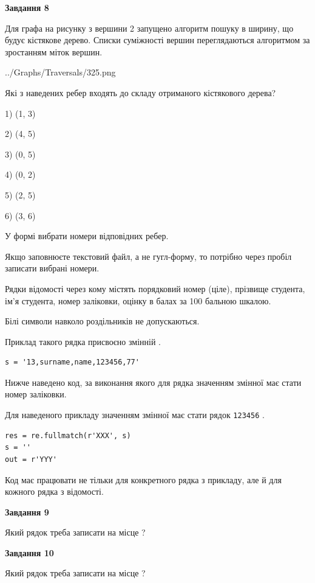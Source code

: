 \documentclass[12pt, ukrainian]{article}
\def\code#1{\Verb!#1!}
\begin{document}
{\begin {large}
{\begin {center}\textbf{Завдання 8}\end {center}}\par
Для графа на рисунку з вершини 2 запущено алгоритм пошуку в ширину, що будує кістякове дерево. Списки суміжності вершин переглядаються алгоритмом за зростанням міток вершин.\par
\begin{center}
	{../Graphs/Traversals/325.png}
\end{center}
\par Які з наведених ребер входять до складу отриманого кістякового дерева?\par
1) (1, 3)\par
2) (4, 5)\par
3) (0, 5)\par
4) (0, 2)\par
5) (2, 5)\par
6) (3, 6)\par
{\vskip 15pt} У формі вибрати номери відповідних ребер.


Якщо заповнюєте текстовий файл, а не гугл-форму, то потрібно через пробіл записа\-ти вибрані номери.\par
\newpage


Рядки відомості через кому містять порядковий номер (ціле), пріз\-ви\-ще студен\-та, ім'я студента, номер заліковки, оцінку в балах за 100 бальною шкалою.

Білі символи навколо роздільників не допускаються.

Приклад такого рядка присвоєно змінній .



\begin{verbatim}
s = '13,surname,name,123456,77'
\end{verbatim}


Нижче наведено код, за виконання якого для рядка  значенням змінної  має стати номер заліковки.

Для наведеного прикладу значенням змінної  має стати рядок \code{123456} .



\begin{verbatim}
res = re.fullmatch(r'XXX', s)
s = ''
out = r'YYY'
\end{verbatim}


Код має працювати не тільки для конкретного рядка з прикладу, але й для кожного рядка з відомості.

{\begin {center}\textbf{Завдання 9}\end {center}}\par
Який рядок треба записати на місце  ?\par
\vspace{5mm}


{\begin {center}\textbf{Завдання 10}\end {center}}\par
Який рядок треба записати на місце  ?\par


\newpage


\end {large}}
\end{document}
